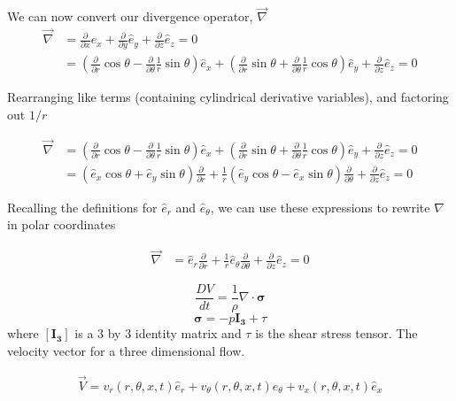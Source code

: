 We can now convert our divergence operator, $\vec{\nabla}$ 
\begin{align*}
	\vec{\nabla} &=
	\frac{\partial }{\partial x} \hat{e}_x +
	\frac{\partial }{\partial y} \hat{e}_y +
	\frac{\partial }{\partial z} \hat{e}_z = 0 \\
	&=
	\left(
	\frac{\partial}{\partial r} \cos \theta -
	\frac{\partial}{\partial \theta} \frac{1}{r} \sin \theta \right)\hat{e}_x +
	\left(
	\frac{\partial} {\partial r} \sin \theta +
	\frac{\partial} {\partial \theta} \frac{1}{r} \cos \theta \right)\hat{e}_y +
	\frac{\partial }{\partial z} \hat{e}_z                        = 0
\end{align*}

Rearranging like terms (containing cylindrical derivative variables), and factoring out $1/r$

\begin{align*}
	\vec{\nabla} &=
	\left(
	\frac{\partial} {\partial r} \cos \theta -
	\frac{\partial} {\partial \theta} \frac{1}{r} \sin \theta
	\right)\hat{e}_x +
	\left(
	\frac{\partial} {\partial r} \sin \theta +
	\frac{\partial} {\partial \theta} \frac{1}{r}\cos  \theta
	\right) \hat{e}_y +
	\frac{\partial }{\partial z} \hat{e}_z = 0 \\
	&= \left(
	\hat{e}_x \cos \theta +
	\hat{e}_y \sin \theta
	\right)
	\frac{\partial} {\partial r} +
	\frac{1}{r}\left(
	\hat{e}_y  \cos \theta -
	\hat{e}_x \sin \theta
	\right)
	\frac{\partial} {\partial \theta} +
	\frac{\partial }{\partial z} \hat{e}_z = 0
\end{align*}

Recalling the definitions for $\hat{e}_r$ and $\hat{e}_{\theta}$, we can use these expressions to rewrite $\nabla$ in polar coordinates

\begin{align*}
	\vec{\nabla} 
	&= \hat{e}_r \frac{\partial} {\partial r} + 
	\frac{1}{r} \hat{e}_{\theta}   
	\frac{\partial} {\partial \theta} + 
	\frac{\partial }{\partial z} \hat{e}_z = 0
\end{align*}
\newpage
\newpage



\[
\frac{DV}{dt}                                               
= \frac{1}{\rho} \nabla \cdot \boldsymbol{\sigma}\]
\[\boldsymbol{\sigma}                                         = -p\boldsymbol{I_3}+ \tau\]
where $\boldsymbol{[I_3]}$ is a 3 by 3 identity matrix and $\tau$ is the shear stress tensor. The velocity vector for a three dimensional flow.

\begin{align}
\vec{V} =
v_r(r,\theta,x,t) \hat{e}_r +
v_{\theta}(r,\theta,x,t) \hat{e}_{\theta} +
v_x(r,\theta,x,t) \hat{e}_x
\end{align}

